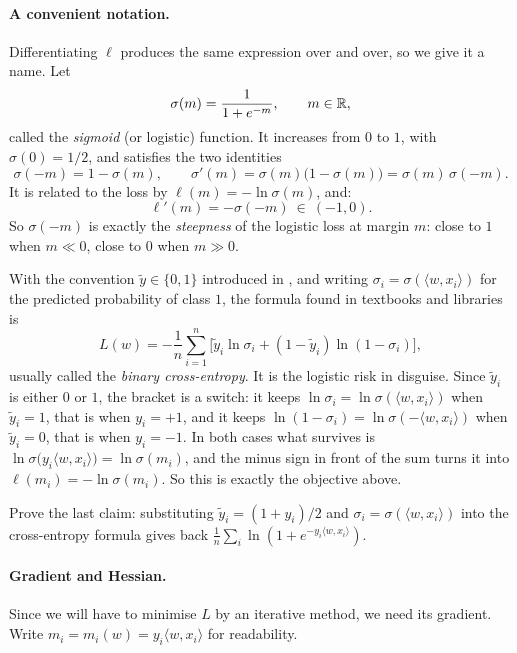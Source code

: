 \paragraph{A convenient notation.}
Differentiating $\ell$ produces the same expression over and over, so we give it a
name. Let
\[
\sigma(m) = \frac{1}{1 + e^{-m}} , \qquad m \in \mathbb{R} ,
\]
called the \emph{sigmoid} (or logistic) function. It increases from $0$ to $1$, with
$\sigma(0) = 1/2$, and satisfies the two identities
\[
\sigma(-m) = 1 - \sigma(m) ,
\qquad
\sigma'(m) = \sigma(m)\big(1 - \sigma(m)\big) = \sigma(m)\, \sigma(-m).
\]
It is related to the loss by $\ell(m) = -\ln \sigma(m)$, and:
\[
\ell'(m) = - \sigma(-m) \ \in \ (-1, 0) .
\]
So $\sigma(-m)$ is exactly the \emph{steepness} of the logistic loss at margin $m$:
close to $1$ when $m \ll 0$, close to $0$ when $m \gg 0$.




\begin{remark}
With the convention $\tilde y \in \{0,1\}$ introduced in , and
writing $\sigma_i = \sigma(\langle w, x_i\rangle)$ for the predicted probability of
class $1$, the formula found in textbooks and libraries is
\[
L(w) = - \frac{1}{n} \sum_{i=1}^n \Big[ \tilde y_i \ln \sigma_i + (1 - \tilde y_i) \ln (1 - \sigma_i) \Big] ,
\]
usually called the \emph{binary cross-entropy}. It is the logistic risk in
disguise. Since $\tilde y_i$ is either $0$ or $1$, the bracket is a switch: it keeps
$\ln \sigma_i = \ln \sigma(\langle w, x_i \rangle)$ when $\tilde y_i = 1$, that is
when $y_i = +1$, and it keeps $\ln(1 - \sigma_i) = \ln \sigma(-\langle w, x_i
\rangle)$ when $\tilde y_i = 0$, that is when $y_i = -1$. In both cases what survives
is $\ln \sigma\big( y_i \langle w, x_i \rangle \big) = \ln \sigma(m_i)$, and the
minus sign in front of the sum turns it into $\ell(m_i) = - \ln \sigma(m_i)$. So this
is exactly the objective above. 
\end{remark}

\begin{exercise}[$\star$]
Prove the last claim: substituting $\tilde y_i = (1 + y_i)/2$ and $\sigma_i =
\sigma(\langle w, x_i\rangle)$ into the cross-entropy formula gives back
$\frac1n \sum_i \ln(1 + e^{-y_i \langle w, x_i\rangle})$.
\end{exercise}

\paragraph{Gradient and Hessian.}
Since we will have to minimise $L$ by an iterative method, we need its gradient. Write
$m_i = m_i(w) = y_i \langle w, x_i \rangle$ for readability.

